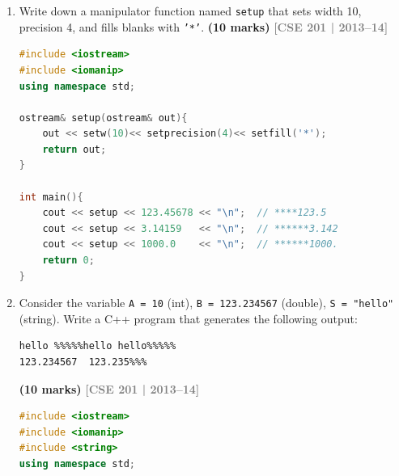\documentclass[12pt,a3paper]{article}
\newcommand{\yr}[1]{\hfill\textcolor{gray}{\small\textbf{[#1]}}}
\newcommand{\mk}[1]{\textcolor{orange!70!black}{\small\textbf{(#1 marks)}}}
\begin{document}
\begin{enumerate}
\begin{tcolorbox}
\begin{lstlisting}[language=C++]
int main(){
    Date d;
    cin  >> d;         // Enter a date in Bangladeshi form: 23/12/2016
    cout << d << "\n"; // Date (Chinese form) is 2016/12/23
    return 0;
}
\end{lstlisting}

\end{tcolorbox}


\item Write down a manipulator function named \texttt{setup} that sets width 10, precision 4, and fills blanks with \texttt{'*'}. \mk{10}
\yr{CSE 201 | 2013--14}
\begin{tcolorbox}[enhanced,breakable,ansbox,colback=cA!4,colframe=cA,
  boxrule=0.8pt,arc=5pt,
  title={\textbf{Answer --- setup manipulator --- width 10, precision 4, fill '*'}},
  fonttitle=\bfseries\color{white},colbacktitle=cA]

\begin{lstlisting}[language=C++]
#include <iostream>
#include <iomanip>
using namespace std;

ostream& setup(ostream& out){
    out << setw(10)<< setprecision(4)<< setfill('*');
    return out;
}

int main(){
    cout << setup << 123.45678 << "\n";  // ****123.5
    cout << setup << 3.14159   << "\n";  // ******3.142
    cout << setup << 1000.0    << "\n";  // ******1000.
    return 0;
}
\end{lstlisting}

\end{tcolorbox}

\item Consider the variable \texttt{A = 10} (int), \texttt{B = 123.234567} (double), \texttt{S = "hello"} (string). Write a C++ program that generates the following output:
\begin{verbatim}
hello %%%%%hello hello%%%%%
123.234567  123.235%%%
\end{verbatim}
\mk{10}
\yr{CSE 201 | 2013--14}
\begin{tcolorbox}[enhanced,breakable,ansbox,colback=cA!4,colframe=cA,
  boxrule=0.8pt,arc=5pt,
  title={\textbf{Answer --- Formatted output for A, B, S}},
  fonttitle=\bfseries\color{white},colbacktitle=cA]

\begin{lstlisting}[language=C++]
#include <iostream>
#include <iomanip>
#include <string>
using namespace std;


\end{lstlisting}
\end{tcolorbox}
\end{enumerate}
\end{document}

